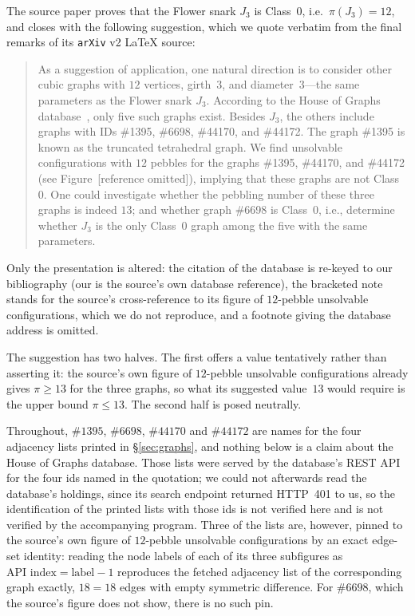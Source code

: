 \documentclass[11pt]{amsart}
\theoremstyle{remark}
\newcommand{\HoG}[1]{\#\mathrm{#1}}
\begin{document}
The source paper proves that the Flower snark $J_3$ is Class~$0$, i.e.\
$\pi(J_3)=12$, and closes with the following suggestion, which we quote verbatim
from the final remarks of its \texttt{arXiv} v2 \LaTeX{} source:

\begin{quote}\small
As a suggestion of application, one natural direction is to consider other cubic
graphs with $12$ vertices, girth~$3$, and diameter~$3$---the same parameters as
the Flower snark $J_3$. According to the House of Graphs
database~\cite{HoG1}, only five such graphs exist. Besides $J_3$, the others
include graphs with IDs \#1395, \#6698, \#44170, and \#44172. The graph \#1395 is
known as the truncated tetrahedral graph. We find unsolvable configurations with
$12$ pebbles for the graphs \#1395, \#44170, and \#44172 (see
Figure~[reference omitted]), implying that these graphs are not Class~$0$. One
could investigate whether the pebbling number of these three graphs is indeed
$13$; and whether graph \#6698 is Class~$0$, i.e., determine whether $J_3$ is the
only Class~$0$ graph among the five with the same parameters.
\end{quote}

Only the presentation is altered: the citation of the database is re-keyed to our
bibliography (our \cite{HoG1} is the source's own database reference), the
bracketed note stands for the source's cross-reference to its figure of
$12$-pebble unsolvable configurations, which we do not reproduce, and a footnote
giving the database address is omitted.

The suggestion has two halves. The first offers a value tentatively rather than
asserting it: the source's own figure of $12$-pebble unsolvable configurations
already gives $\pi\ge13$ for the three graphs, so what its suggested value~$13$
would require is the upper bound $\pi\le13$. The second half is posed neutrally.

Throughout, $\HoG{1395}$, $\HoG{6698}$, $\HoG{44170}$ and $\HoG{44172}$ are names
for the four adjacency lists printed in \S\ref{sec:graphs}, and nothing below is a
claim about the House of Graphs database. Those lists were served by the
database's REST API for the four ids named in the quotation; we could not
afterwards read the database's holdings, since its search endpoint returned
HTTP~401 to us, so the identification of the printed lists with those ids is not
verified here and is not verified by the accompanying program. Three of the lists
are, however, pinned to the source's own figure of $12$-pebble unsolvable
configurations by an exact edge-set identity: reading the node labels of each of
its three subfigures as $\text{API index}=\text{label}-1$ reproduces the fetched
adjacency list of the corresponding graph exactly, $18=18$ edges with empty
symmetric difference. For $\HoG{6698}$, which the source's figure does not show,
there is no such pin.
\end{document}
